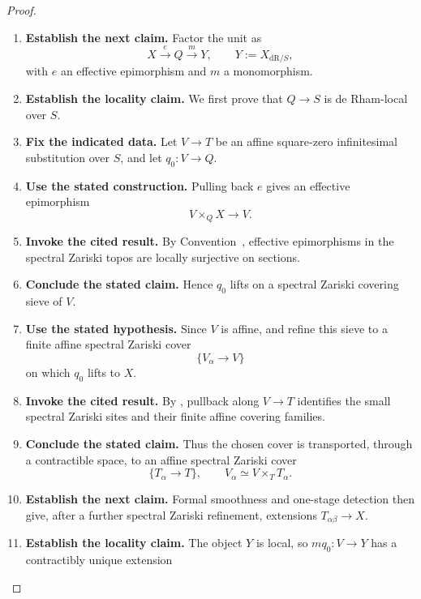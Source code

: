 \begin{proof}
\leavevmode
\begin{enumerate}[label=\textup{(\arabic*)}]
    \item \textbf{Establish the next claim.}
    Factor the unit as
    \[
    X\xrightarrow{e}Q\xrightarrow{m}Y,
    \qquad
    Y:=X_{\mathrm{dR}/S},
    \]
    with \(e\) an effective epimorphism and \(m\) a monomorphism.
    \item \textbf{Establish the locality claim.}
    We first prove that \(Q\to S\) is
    de Rham-local over \(S\).
    \item \textbf{Fix the indicated data.}
    Let \(V\to T\) be an affine square-zero infinitesimal substitution over \(S\),
    and let \(q_0:V\to Q\).
    \item \textbf{Use the stated construction.}
    Pulling back \(e\) gives an effective epimorphism
    \[
    V\times_QX\longrightarrow V.
    \]
    \item \textbf{Invoke the cited result.}
    By Convention~, effective
    epimorphisms in the spectral Zariski topos are locally surjective on sections.
    \item \textbf{Conclude the stated claim.}
    Hence \(q_0\) lifts on a spectral Zariski covering sieve of \(V\).
    \item \textbf{Use the stated hypothesis.}
    Since
    \(V\) is affine,  and
     refine this sieve to
    a finite affine spectral Zariski cover
    \[
    \{V_\alpha\to V\}
    \]
    on which \(q_0\) lifts to \(X\).
    \item \textbf{Invoke the cited result.}
    By , pullback along
    \(V\to T\) identifies the small spectral Zariski sites and their finite affine
    covering families.
    \item \textbf{Conclude the stated claim.}
    Thus the chosen cover is transported, through a
    contractible space, to an affine spectral Zariski cover
    \[
    \{T_\alpha\to T\},
    \qquad
    V_\alpha\simeq V\times_TT_\alpha.
    \]
    \item \textbf{Establish the next claim.}
    Formal smoothness and one-stage detection then give, after a further spectral
    Zariski refinement, extensions \(T_{\alpha\beta}\to X\).
    \item \textbf{Establish the locality claim.}
    The object \(Y\) is local, so \(mq_0:V\to Y\) has a contractibly unique extension

\end{enumerate}
\end{proof}

